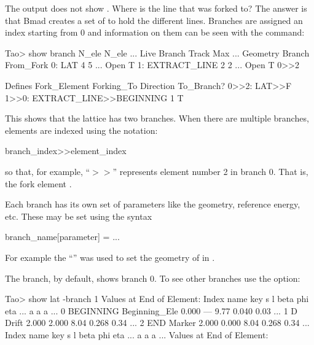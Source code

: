 \documentclass{hitec}     %
\begin{document}
{The  output does not show . Where is the line that was forked to? The answer is
that Bmad creates a set of  to hold the different lines. Branches are assigned an index
starting from 0 and information on them can be seen with the  command:
\begin{code}
Tao> show branch
                    N_ele  N_ele   ...              Live
  Branch            Track    Max   ...    Geometry  Branch  From_Fork
  0: LAT                4      5   ...    Open       T
  1: EXTRACT_LINE       2      2   ...    Open       T      0>>2
 
                                                                    Defines
  Fork_Element      Forking_To                         Direction    To_Branch?
  0>>2: LAT>>F      1>>0: EXTRACT_LINE>>BEGINNING        1             T
\end{code}  
This shows that the lattice has two branches. When there are multiple branches, elements
are indexed using the notation:
\begin{code}
branch_index>>element_index
\end{code}
so that, for example, ``$>>$'' represents element number 2 in branch 0. That is, the
fork element . 

Each branch has its own set of parameters like the geometry, reference energy, etc. These may be set
using the syntax
\begin{code}
  branch_name[parameter] = ...
\end{code}
For example the ``'' was used to set the geometry of  in
.

The  branch, by default, shows branch 0. To see other branches use the  option:
\begin{code}
Tao> show lat -branch 1
      Values at End of Element:
 Index  name      key                     s       l    beta     phi    eta ...
                                                          a       a      a ...
     0  BEGINNING Beginning_Ele       0.000     ---    9.77   0.040   0.03 ...
     1  D         Drift               2.000   2.000    8.04   0.268   0.34 ...
     2  END       Marker              2.000   0.000    8.04   0.268   0.34 ...
 Index  name      key                     s       l    beta     phi    eta ...
                                                          a       a      a ...
      Values at End of Element:
\end{code}

}
\end{document}
